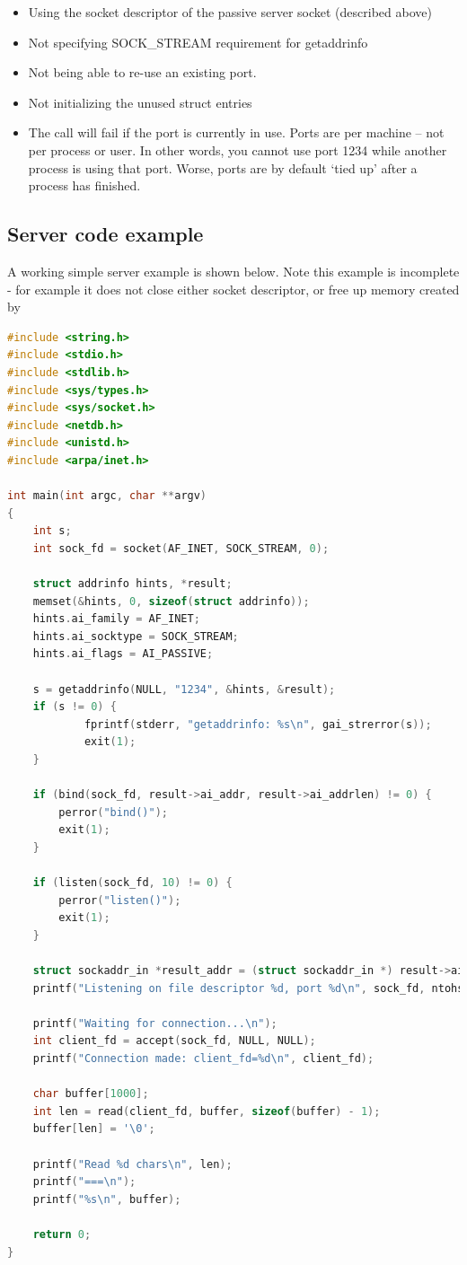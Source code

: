 \begin{itemize}
\tightlist
\item
  Using the socket descriptor of the passive server socket (described above)
\item
  Not specifying SOCK\_STREAM requirement for getaddrinfo
\item
  Not being able to re-use an existing port.
\item
  Not initializing the unused struct entries
\item
  The  call will fail if the port is currently in use. Ports are per machine -- not per process or user.
  In other words, you cannot use port 1234 while another process is using that port.
  Worse, ports are by default `tied up' after a process has finished.
\end{itemize}

\subsection{Server code example}

A working simple server example is shown below.
Note this example is incomplete - for example it does not close either socket descriptor, or free up memory created by 

\begin{lstlisting}[language=C]
#include <string.h>
#include <stdio.h>
#include <stdlib.h>
#include <sys/types.h>
#include <sys/socket.h>
#include <netdb.h>
#include <unistd.h>
#include <arpa/inet.h>

int main(int argc, char **argv)
{
    int s;
    int sock_fd = socket(AF_INET, SOCK_STREAM, 0);

    struct addrinfo hints, *result;
    memset(&hints, 0, sizeof(struct addrinfo));
    hints.ai_family = AF_INET;
    hints.ai_socktype = SOCK_STREAM;
    hints.ai_flags = AI_PASSIVE;

    s = getaddrinfo(NULL, "1234", &hints, &result);
    if (s != 0) {
            fprintf(stderr, "getaddrinfo: %s\n", gai_strerror(s));
            exit(1);
    }

    if (bind(sock_fd, result->ai_addr, result->ai_addrlen) != 0) {
        perror("bind()");
        exit(1);
    }

    if (listen(sock_fd, 10) != 0) {
        perror("listen()");
        exit(1);
    }
    
    struct sockaddr_in *result_addr = (struct sockaddr_in *) result->ai_addr;
    printf("Listening on file descriptor %d, port %d\n", sock_fd, ntohs(result_addr->sin_port));

    printf("Waiting for connection...\n");
    int client_fd = accept(sock_fd, NULL, NULL);
    printf("Connection made: client_fd=%d\n", client_fd);

    char buffer[1000];
    int len = read(client_fd, buffer, sizeof(buffer) - 1);
    buffer[len] = '\0';

    printf("Read %d chars\n", len);
    printf("===\n");
    printf("%s\n", buffer);

    return 0;
}
\end{lstlisting}

